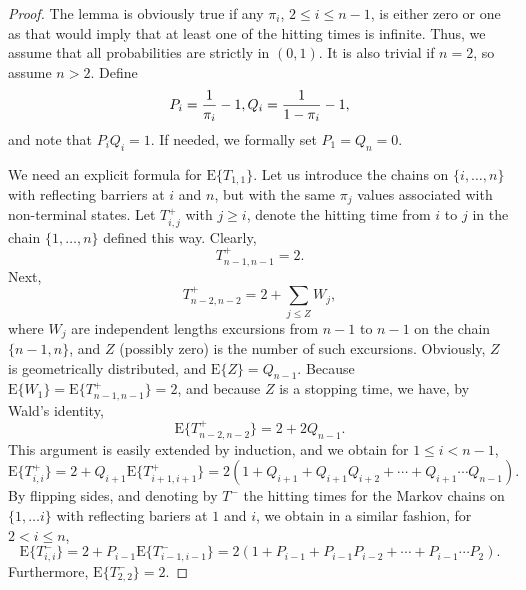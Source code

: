 \documentclass [letterpaper] {patmorin}
\newcommand{\EXP}{\mathrm{E}}
\newcommand{\PROB}{\Pr}
\begin{document}
\begin{proof}
The lemma is obviously true if any $\pi_i$, $2 \le i \le n-1$, is either
zero or one as that would imply that at least one of the hitting times is
infinite. Thus, we assume that all probabilities are strictly in $(0,1)$.
It is also trivial if $n=2$, so assume $n > 2$.
Define
\[
P_i = {1 \over \pi_i } - 1, Q_i = {1 \over 1-\pi_i} - 1,
\]
and note that $P_i Q_i = 1$.
If needed, we formally set $P_1 = Q_n = 0$.
%  

We need an explicit formula for $\EXP \{ T_{1,1} \}$.
Let us introduce the chains on $\{ i, \ldots , n \}$ with
reflecting barriers at $i$ and $n$, but with the same $\pi_j$ values
associated with non-terminal states. 
Let $T^+_{i,j}$ with $j \ge i$, denote the hitting time from $i$ to $j$ in the chain $\{1,\ldots,n\}$ defined this way.
Clearly,
\[
T^+_{n-1, n-1} = 2.
\]
Next,
\[
T^+_{n-2, n-2 } = 2 + \sum_{j \le Z} W_j,
\]
where $W_j$ are independent lengths excursions from $n-1$ to  $n-1$
on the chain $\{ n-1, n \}$, and $Z$ (possibly zero) is the number of such excursions.
Obviously, $Z$ is geometrically distributed, and $\EXP \{ Z \} = Q_{n-1}$.
Because $\EXP \{ W_1 \} = \EXP \{ T^+_{n-1, n-1} \} = 2$,
and because $Z$ is a stopping time, 
we have, by Wald's identity,
\[
\EXP \{ T^+_{n-2, n-2} \} = 2 + 2 Q_{n-1}.
\]
This argument is easily extended by induction, and we obtain for $1 \le i < n-1$,
\[
\EXP \{ T^+_{i, i} \}  = 2 + Q_{i+1} \EXP \{ T^+_{i+1, i+1} \}
  = 2 \left( 1 + Q_{i+1} + Q_{i+1} Q_{i+2} + \cdots + Q_{i+1} \cdots Q_{n-1} \right).
\]
By flipping sides, and denoting by $T^-$ the hitting times for
the Markov chains on $\{ 1, \ldots i \}$
with reflecting bariers at $1$ and $i$, we obtain in a similar fashion,
for $2 < i \le n$,
\[
\EXP \{ T^-_{i, i} \}  = 2 + P_{i-1} \EXP \{ T^-_{i-1, i-1} \}
  = 2 \left( 1 + P_{i-1} + P_{i-1} P_{i-2} + \cdots + P_{i-1} \cdots P_{2} \right).
\]
Furthermore, $\EXP \{ T^-_{2, 2} \}  =2$.


\end{proof}
\end{document}
